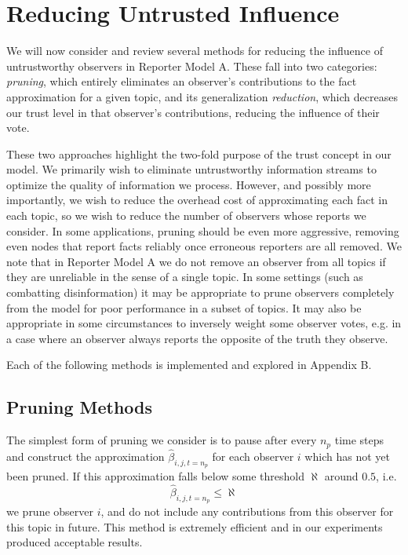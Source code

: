 \documentclass{amsart}
\theoremstyle{plain}
\numberwithin{equation}{section}
\begin{document}
\section{Reducing Untrusted Influence}

We will now consider and review several methods for reducing the influence
of untrustworthy observers in Reporter Model A. These fall into two
categories: \emph{pruning}, which entirely eliminates an observer's
contributions to the fact approximation for a given topic, and its
generalization \emph{reduction}, which decreases our trust level in that
observer's contributions, reducing the influence of their vote. 

These two approaches highlight the two-fold purpose of the trust concept in
our model. We primarily wish to eliminate untrustworthy information streams
to optimize the quality of information we process. However, and possibly
more importantly, we wish to reduce the overhead cost of approximating each
fact in each topic, so we wish to reduce the number of observers whose
reports we consider. In some applications, pruning should be even more
aggressive, removing even nodes that report facts reliably once erroneous
reporters are all removed. We note that in Reporter Model A we do not remove
an observer from all topics if they are unreliable in the sense of a single
topic. In some settings (such as combatting disinformation) it may be
appropriate to prune observers completely from the model for poor
performance in a subset of topics. It may also be appropriate in some
circumstances to inversely weight some observer votes, e.g. in a case where
an observer always reports the opposite of the truth they observe.

Each of the following methods is implemented and explored in Appendix B.

\subsection{Pruning Methods}

The simplest form of pruning we consider is to pause after every $n_{p}$
time steps and construct the approximation $\hat{\beta}_{i,j,t=n_{p}}$ for
each observer $i$ which has not yet been pruned. If this approximation falls
below some threshold $\aleph $ around $0.5$, i.e.%
\begin{equation*}
\hat{\beta}_{i,j,t=n_{p}}\leq \aleph 
\end{equation*}%
we prune observer $i$, and do not include any contributions from this
observer for this topic in future. This method is extremely efficient and in
our experiments produced acceptable results.
\end{document}
